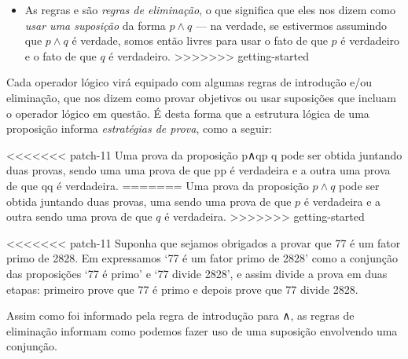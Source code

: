 \begin{itemizar}
\begin{itemize}
\item As regras  e  são \textit{regras de eliminação}, o que significa que eles nos dizem como \textit{usar uma suposição} da forma $p \wedge q$ --- na verdade, se estivermos assumindo que $p \wedge q$ é verdade, somos então livres para usar o fato de que $p$ é verdadeiro e o fato de que $q$ é verdadeiro.
>>>>>>> getting-started
\end{itemize}

Cada operador lógico virá equipado com algumas regras de introdução e/ou eliminação, que nos dizem como provar objetivos ou usar suposições que incluam o operador lógico em questão. É desta forma que a estrutura lógica de uma proposição informa \textit{estratégias de prova}, como a seguir:

\begin{strategy}
\label{strProvingConjunctionsDirect}
<<<<<<< patch-11
Uma prova da proposição p∧qp \wedge q pode ser obtida juntando duas provas, sendo uma uma prova de que pp é verdadeira e a outra uma prova de que qq é verdadeira.
=======
Uma prova da proposição $p \wedge q$ pode ser obtida juntando duas provas, uma sendo uma prova de que $p$ é verdadeira e a outra sendo uma prova de que $q$ é verdadeira.
>>>>>>> getting-started
\end{strategy}

\begin{example}
\label{exSevenDividesTwentyEightConjunctionProof}
<<<<<<< patch-11
Suponha que sejamos obrigados a provar que 77 é um fator primo de 2828. Em  expressamos `77 é um fator primo de 2828' como a conjunção das proposições `77 é primo' e `77 divide 2828', e assim  divide a prova em duas etapas: primeiro prove que 77 é primo e depois prove que 77 divide 2828.
\end{example}

Assim como  foi informado pela regra de introdução para ∧\wedge, as regras de eliminação informam como podemos fazer uso de uma suposição envolvendo uma conjunção.

\end{itemizar}
